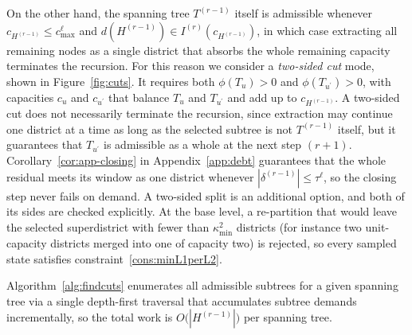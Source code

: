 \documentclass[11pt]{article}
\theoremstyle{definition}
\begin{document}
On the other hand, the spanning tree $T^{(r-1)}$ itself is admissible whenever $c_{H^{(r-1)}} \leq c^\ell_{\max}$ and $d(H^{(r-1)}) \in I^{(r)}(c_{H^{(r-1)}})$, in which case extracting all remaining nodes as a single district that absorbs the whole remaining capacity terminates the recursion. For this reason we consider a \emph{two-sided cut} mode, shown in Figure~\hyperref[fig:4b]{\ref*{fig:cuts}}. It requires both $\phi(T_u) > 0$ and $\phi(T_{u^\prime})>0$, with capacities $c_u$ and $c_{u^\prime}$ that balance $T_u$ and $T_{u^{\prime}}$ and add up to $c_{H^{(r-1)}}$. A two-sided cut does not necessarily terminate the recursion, since extraction may continue one district at a time as long as the selected subtree is not $T^{(r-1)}$ itself, but it guarantees that $T_{u^\prime}$ is admissible as a whole at the next step $(r+1)$. Corollary~\ref{cor:app-closing} in Appendix~\ref{app:debt} guarantees that the whole residual meets its window as one district whenever $|\delta^{(r-1)}| \leq \tau^{\ell}$, so the closing step never fails on demand. A two-sided split is an additional option, and both of its sides are checked explicitly. At the base level, a re-partition that would leave the selected superdistrict with fewer than $\kappa^2_{\min}$ districts (for instance two unit-capacity districts merged into one of capacity two) is rejected, so every sampled state satisfies constraint~\eqref{cons:minL1perL2}.



Algorithm~\ref{alg:findcuts} enumerates all admissible subtrees for a given
spanning tree via a single depth-first traversal that accumulates subtree demands incrementally, so the total work is $O\bigl(|H^{(r-1)}|\bigr)$ per spanning tree.

\medskip
\medskip
\end{document}
